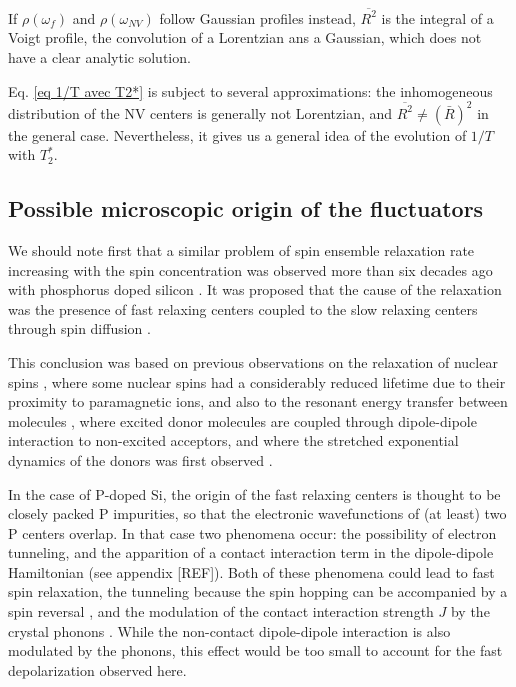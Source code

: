 \documentclass[a4paper,11pt]{report}
\begin{document}
If $\rho(\omega_{f})$ and $\rho(\omega_{NV})$ follow Gaussian profiles instead, $\overline{R^2}$ is the integral of a Voigt profile, the convolution of a Lorentzian ans a Gaussian, which does not have a clear analytic solution.

Eq. \ref{eq 1/T avec T2*} is subject to several approximations: the inhomogeneous distribution of the NV centers is generally not Lorentzian, and $\overline{R^2} \neq (\bar{R})^2$ in the general case. Nevertheless, it gives us a general idea of the evolution of $1/T$ with $T_2^*$.

 \subsection{Possible microscopic origin of the fluctuators}

We should note first that a similar problem of spin ensemble relaxation rate increasing with the spin concentration was observed more than six decades ago with phosphorus doped silicon \citep{feher1959electron,honig1960electron}. It was proposed that the cause of the relaxation was the presence of fast relaxing centers coupled to the slow relaxing centers through spin diffusion \citep{honig1960electron, sugihara1963spin, yang1968concentration, vugmeister1978spin, berman2005spin}. 

This conclusion was based on previous observations on the relaxation of nuclear spins \citep{bloembergen1949interaction, de1958relaxation, blumberg1960nuclear}, where some nuclear spins had a considerably reduced lifetime due to their proximity to paramagnetic ions, and also to the resonant energy transfer between molecules \citep{forster1949experimentelle, eisenthal1964influence, yokota1967effects}, where excited donor molecules are coupled through dipole-dipole interaction to non-excited acceptors, and where the stretched exponential dynamics of the donors was first observed \citep{forster1949experimentelle}.

In the case of P-doped Si, the origin of the fast relaxing centers is thought to be closely packed P impurities, so that the electronic wavefunctions of (at least) two P centers overlap. In that case two phenomena occur: the possibility of electron tunneling, and the apparition of a contact interaction term in the dipole-dipole Hamiltonian (see appendix [REF]). Both of these phenomena could lead to fast spin relaxation, the tunneling because the spin hopping can be accompanied by a spin reversal \citep{sugihara1963spin}, and the modulation of the contact interaction strength $J$ by the crystal phonons \citep{honig1960electron}. While the non-contact dipole-dipole interaction is also modulated by the phonons, this effect would be too small to account for the fast depolarization observed here.
\end{document}
